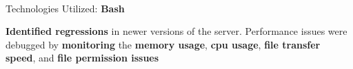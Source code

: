 \documentclass[]{deedy-resume-openfont}
\begin{document}
\begin{minipage}[t]{0.66\textwidth}
\\
\begin{tightemize}
\item Technologies Utilized: \textbf{Bash}
\item \textbf{Identified regressions} in newer versions of the server. Performance issues were debugged by \textbf{monitoring} the \textbf{memory usage}, \textbf{cpu usage}, \textbf{file transfer speed}, and \textbf{file permission issues}
\end{tightemize}
\sectionsep





\end{minipage}
\end{document}
